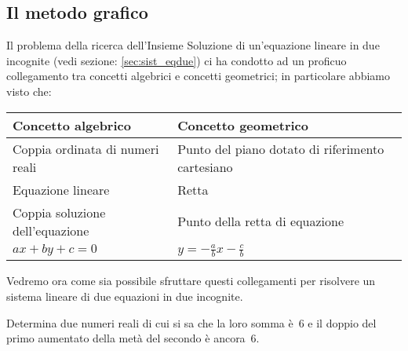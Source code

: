 % 
% 
% 

\subsection{Il metodo grafico}
Il problema della ricerca dell'Insieme Soluzione di
un'equazione lineare in due incognite (vedi sezione: \ref{sec:sist_eqdue}) 
ci ha condotto ad un proficuo collegamento tra concetti algebrici e 
concetti geometrici; in particolare abbiamo visto che:

\begin{center}
 \begin{tabularx}{.9\textwidth}{XX}
\toprule
 Concetto algebrico & Concetto geometrico\\
 \midrule
Coppia ordinata di numeri reali & Punto del piano dotato di riferimento 
cartesiano\\
Equazione lineare & Retta \\
Coppia soluzione dell'equazione& Punto della retta di equazione \\
\(ax+by+c=0\) & \(y=-{\frac{a}{b}}x-\frac{c}{b}\)\\
\bottomrule
 \end{tabularx}

\end{center}
Vedremo ora come sia possibile sfruttare questi collegamenti per
risolvere un sistema lineare di due equazioni in due incognite.

\begin{problema}
Determina due numeri reali di cui si sa che la loro somma è~6 e il
doppio del primo aumentato della metà del secondo è ancora~6.
\end{problema}

